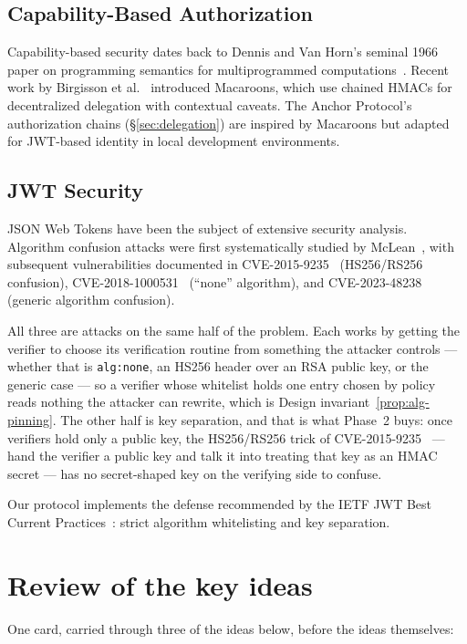 \documentclass[11pt,a4paper]{article}
\theoremstyle{definition}
\begin{document}
\subsection{Capability-Based Authorization}

Capability-based security dates back to Dennis and Van Horn's seminal 1966 paper on programming semantics for multiprogrammed computations~. Recent work by Birgisson et al.~ introduced Macaroons, which use chained HMACs for decentralized delegation with contextual caveats. The Anchor Protocol's authorization chains (\S\ref{sec:delegation}) are inspired by Macaroons but adapted for JWT-based identity in local development environments.

\subsection{JWT Security}

JSON Web Tokens have been the subject of extensive security analysis. Algorithm confusion attacks were first systematically studied by McLean~, with subsequent vulnerabilities documented in CVE-2015-9235~ (HS256/RS256 confusion), CVE-2018-1000531~ (``none'' algorithm), and CVE-2023-48238~ (generic algorithm confusion).

All three are attacks on the same half of the problem. Each works by getting the verifier to choose its verification routine from something the attacker controls --- whether that is \texttt{alg:none}, an HS256 header over an RSA public key, or the generic case --- so a verifier whose whitelist holds one entry chosen by policy reads nothing the attacker can rewrite, which is Design invariant~\ref{prop:alg-pinning}. The other half is key separation, and that is what Phase~2 buys: once verifiers hold only a public key, the HS256/RS256 trick of CVE-2015-9235~ --- hand the verifier a public key and talk it into treating that key as an HMAC secret --- has no secret-shaped key on the verifying side to confuse.

Our protocol implements the defense recommended by the IETF JWT Best Current Practices~: strict algorithm whitelisting and key separation.

\section*{Review of the key ideas}
One card, carried through three of the ideas below, before the ideas themselves:
\end{document}
